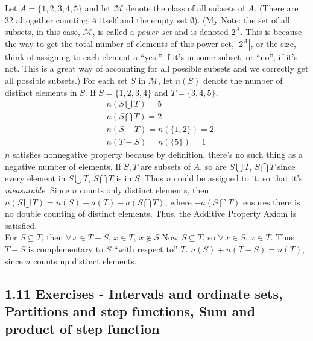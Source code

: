\documentclass[twoside]{amsart}
\theoremstyle{plain}
\theoremstyle{definition}
\newcommand{\exercisehead}[1]
  {\smallskip
   \noindent{\small\bf Exercise #1.}}
\begin{document}
\exercisehead{6} Let $A = \{ 1, 2, 3, 4,5 \}$ and let $\mathcal{M}$ denote the class of all subsets of $A$.  (There are 32 altogether counting $A$ itself and the empty set $\emptyset$).  (My Note: the set of all subsets, in this case, $\mathcal{M}$, is called a \emph{power set} and is denoted $2^A$.  This is because the way to get the total number of elements of this power set, $|2^{A}|$, or the size, think of assigning to each element a ``yes,'' if it's in some subset, or ``no'', if it's not.  This is a great way of accounting for all possible subsets and we correctly get all possible subsets.) For each set $S$ in $\mathcal{M}$, let $n(S)$ denote the number of distinct elements in $S$.  If $S = \{ 1,2,3,4 \}$ and $T = \{ 3,4,5 \}$, 
\[
\begin{aligned}
  & n(S \bigcup T) = 5 \\
  & n(S \bigcap T) = 2 \\
  & n(S-T) = n(\{ 1,2 \} ) = 2 \\
  & n(T-S) = n(\{ 5 \}) = 1
\end{aligned}
\]
$n$ satisfies nonnegative property because by definition, there's no such thing as a negative number of elements.  If $S,T$ are subsets of $A$, so are $S \bigcup T$, $S \bigcap T$ since every element in $S \bigcup T$, $S \bigcap T$ is in $S$.  Thus $n$ could be assigned to it, so that it's \emph{measurable}.  Since $n$ counts only distinct elements, then $n(S \bigcup T) = n(S) + a(T) - a(S \bigcap T)$, where $-a(S \bigcap T)$ ensures there is no double counting of distinct elements.  Thus, the Additive Property Axiom is satisfied.  \bigskip \\

For $S \subseteq T$, then $\forall \, x \in T-S$, $x \in T, \, x \notin S$  Now $S \subseteq T$, so $\forall \, x \in S$, $x \in T$.  Thus $T-S$ is complementary to $S$ ``with respect to'' $T$.  $n(S) + n(T-S) = n(T)$, since $n$ counts up distinct elements.  


\subsection*{ 1.11 Exercises - Intervals and ordinate sets, Partitions and step functions, Sum and product of step function }
\end{document}
